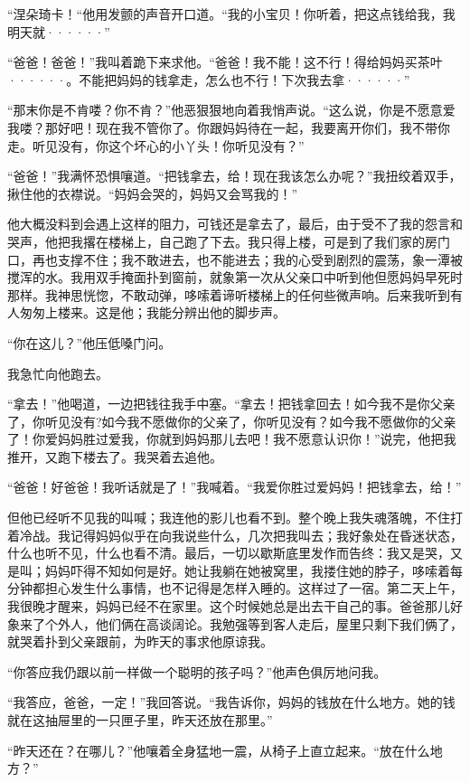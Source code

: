 \documentclass[12pt, UTF8]{ctexbook}
\begin{document}
\par “涅朵琦卡！“他用发颤的声音开口道。“我的小宝贝！你听着，把这点钱给我，我明天就······”
\par “爸爸！爸爸！”我叫着跪下来求他。“爸爸！我不能！这不行！得给妈妈买茶叶······。不能把妈妈的钱拿走，怎么也不行！下次我去拿······”
\par “那末你是不肯喽？你不肯？”他恶狠狠地向着我悄声说。“这么说，你是不愿意爱我喽？那好吧！现在我不管你了。你跟妈妈待在一起，我要离开你们，我不带你走。听见没有，你这个坏心的小丫头！你听见没有？”
\par “爸爸！”我满怀恐惧嚷道。“把钱拿去，给！现在我该怎么办呢？”我扭绞着双手，揪住他的衣襟说。“妈妈会哭的，妈妈又会骂我的！”
\par 他大概没料到会遇上这样的阻力，可钱还是拿去了，最后，由于受不了我的怨言和哭声，他把我撂在楼梯上，自己跑了下去。我只得上楼，可是到了我们家的房门口，再也支撑不住；我不敢进去，也不能进去；我的心受到剧烈的震荡，象一潭被搅浑的水。我用双手掩面扑到窗前，就象第一次从父亲口中听到他但愿妈妈早死时那样。我神思恍惚，不敢动弹，哆嗦着谛听楼梯上的任何些微声响。后来我听到有人匆匆上楼来。这是他；我能分辨出他的脚步声。
\par “你在这儿？”他压低嗓门问。
\par 我急忙向他跑去。
\par “拿去！”他喝道，一边把钱往我手中塞。“拿去！把钱拿回去！如今我不是你父亲了，你听见没有?如今我不愿做你的父亲了，你听见没有？如今我不愿做你的父亲了！你爱妈妈胜过爱我，你就到妈妈那儿去吧！我不愿意认识你！”说完，他把我推开，又跑下楼去了。我哭着去追他。
\par “爸爸！好爸爸！我听话就是了！”我喊着。“我爱你胜过爱妈妈！把钱拿去，给！”
\par 但他已经听不见我的叫喊；我连他的影儿也看不到。整个晚上我失魂落魄，不住打着冷战。我记得妈妈似乎在向我说些什么，几次把我叫去；我好象处在昏迷状态，什么也听不见，什么也看不清。最后，一切以歇斯底里发作而告终：我又是哭，又是叫；妈妈吓得不知如何是好。她让我躺在她被窝里，我搂住她的脖子，哆嗦着每分钟都担心发生什么事情，也不记得是怎样入睡的。这样过了一宿。第二天上午，我很晚才醒来，妈妈已经不在家里。这个时候她总是出去干自己的事。爸爸那儿好象来了个外人，他们俩在高谈阔论。我勉强等到客人走后，屋里只剩下我们俩了，就哭着扑到父亲跟前，为昨天的事求他原谅我。
\par “你答应我仍跟以前一样做一个聪明的孩子吗？”他声色俱厉地问我。
\par “我答应，爸爸，一定！”我回答说。“我告诉你，妈妈的钱放在什么地方。她的钱就在这抽屉里的一只匣子里，昨天还放在那里。”
\par “昨天还在？在哪儿？”他嚷着全身猛地一震，从椅子上直立起来。“放在什么地方？”
\end{document}
